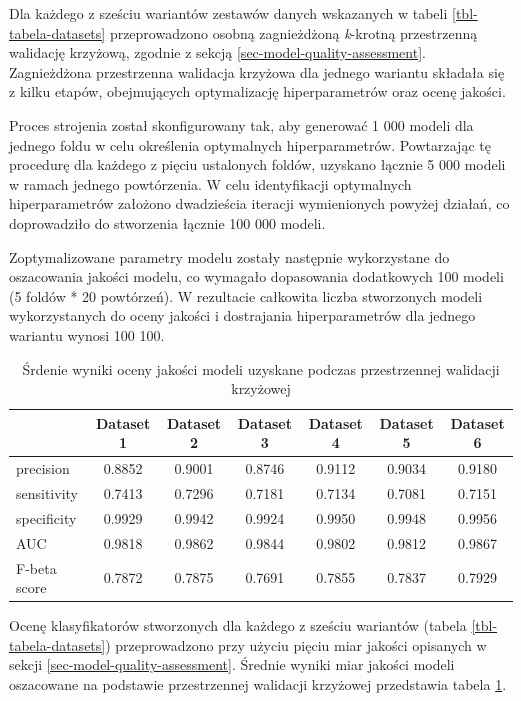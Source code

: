 \documentclass{amuthesis}
\begin{document}
Dla każdego z sześciu wariantów zestawów danych wskazanych w tabeli
\ref{tbl-tabela-datasets} przeprowadzono osobną zagnieżdżoną
\emph{k}-krotną przestrzenną walidację krzyżową, zgodnie z sekcją
\ref{sec-model-quality-assessment}. Zagnieżdżona przestrzenna walidacja
krzyżowa dla jednego wariantu składała się z kilku etapów, obejmujących
optymalizację hiperparametrów oraz ocenę jakości.

Proces strojenia został skonfigurowany tak, aby generować 1 000 modeli
dla jednego foldu w celu określenia optymalnych hiperparametrów.
Powtarzając tę procedurę dla każdego z pięciu ustalonych foldów,
uzyskano łącznie 5 000 modeli w ramach jednego powtórzenia. W celu
identyfikacji optymalnych hiperparametrów założono dwadzieścia iteracji
wymienionych powyżej działań, co doprowadziło do stworzenia łącznie 100
000 modeli.

Zoptymalizowane parametry modelu zostały następnie wykorzystane do
oszacowania jakości modelu, co wymagało dopasowania dodatkowych 100
modeli (5 foldów * 20 powtórzeń). W rezultacie całkowita liczba
stworzonych modeli wykorzystanych do oceny jakości i dostrajania
hiperparametrów dla jednego wariantu wynosi 100 100.

\hypertarget{tbl-tabela-performance-measures}{}
\begin{table}
\caption{\label{tbl-tabela-performance-measures}Śrdenie wyniki oceny jakości modeli uzyskane podczas przestrzennej
walidacji krzyżowej }\tabularnewline

\centering
\begin{tabular}{lcccccc}
\toprule
  & Dataset 1 & Dataset 2 & Dataset 3 & Dataset 4 & Dataset 5 & Dataset 6\\
\midrule
precision & 0.8852 & 0.9001 & 0.8746 & 0.9112 & 0.9034 & 0.9180\\
sensitivity & 0.7413 & 0.7296 & 0.7181 & 0.7134 & 0.7081 & 0.7151\\
specificity & 0.9929 & 0.9942 & 0.9924 & 0.9950 & 0.9948 & 0.9956\\
AUC & 0.9818 & 0.9862 & 0.9844 & 0.9802 & 0.9812 & 0.9867\\
F-beta score & 0.7872 & 0.7875 & 0.7691 & 0.7855 & 0.7837 & 0.7929\\
\bottomrule
\end{tabular}
\end{table}

Ocenę klasyfikatorów stworzonych dla każdego z sześciu wariantów (tabela
\ref{tbl-tabela-datasets}) przeprowadzono przy użyciu pięciu miar
jakości opisanych w sekcji \ref{sec-model-quality-assessment}. Średnie
wyniki miar jakości modeli oszacowane na podstawie przestrzennej
walidacji krzyżowej przedstawia tabela
\ref{tbl-tabela-performance-measures}.
\end{document}

